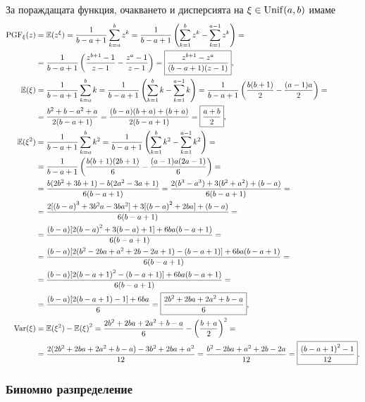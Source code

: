 \documentclass[numbers=endperiod, DIV=15, bibliography=totocnumbered]{scrartcl}
\begin{document}
За пораждащата функция, очакването и дисперсията на $\xi \in \operatorname{Unif}(a, b)$ имаме
\begingroup
\allowdisplaybreaks
\begin{align*}
  \operatorname{PGF}_\xi(z)
  &=
  \mathbb{E}(z^\xi)
  =
  \frac 1 {b-a+1} \sum_{k=a}^b z^k
  =
  \frac 1 {b-a+1} \left( \sum_{k=1}^b z^k - \sum_{k=1}^{a-1} z^k \right)
  = \\ &=
  \frac 1 {b-a+1} \left(\frac {z^{b+1} - 1} {z - 1} - \frac {z^a - 1} {z - 1} \right)
  =
  \boxed{\frac {z^{b+1} - z^a} {(b-a+1)(z-1)}},
  \\
  \mathbb{E}(\xi)
  &=
  \frac 1 {b-a+1} \sum_{k=a}^b k
  =
  \frac 1 {b-a+1} \left( \sum_{k=1}^b k - \sum_{k=1}^{a-1} k \right)
  =
  \frac 1 {b-a+1} \left( \frac {b(b+1)} 2 - \frac {(a-1)a} 2 \right)
  = \\ &=
  \frac {b^2 + b - a^2 + a} {2(b-a+1)}
  =
  \frac {(b-a)(b+a) + (b+a)} {2(b-a+1)}
  =
  \boxed{\frac {a+b} 2},
  \\
  \mathbb{E}(\xi^2)
  &=
  \frac 1 {b-a+1} \sum_{k=a}^b k^2
  =
  \frac 1 {b-a+1} \left( \sum_{k=1}^b k^2 - \sum_{k=1}^{a-1} k^2 \right)
  = \\ &=
  \frac 1 {b-a+1} \left( \frac {b(b+1)(2b+1)} 6 - \frac {(a-1)a(2a-1)} 6 \right)
  = \\ &=
  \frac {b(2b^2 + 3b + 1) - b(2a^2 - 3a + 1)} {6(b-a+1)}
  =
  \frac {2(b^3 - a^3) + 3(b^2 + a^2) + (b-a)} {6(b-a+1)}
  = \\ &=
  \frac {2[{(b-a)}^3 + 3b^2a - 3ba^2] + 3[{(b-a)}^2 + 2ba] + (b-a)} {6(b-a+1)}
  = \\ &=
  \frac {(b-a) [2{(b-a)}^2 + 3(b-a) + 1] + 6ba(b-a+1)} {6(b-a+1)}
  = \\ &=
  \frac {(b-a) [2(b^2 - 2ba + a^2 + 2b - 2a + 1) - (b-a+1)] + 6ba(b-a+1)} {6(b-a+1)}
  = \\ &=
  \frac {(b-a) [2{(b-a+1)}^2 - (b-a+1)] + 6ba(b-a+1)} {6(b-a+1)}
  = \\ &=
  \frac {(b-a) [2(b-a+1)-1] + 6ba} 6
  =
  \boxed{\frac {2b^2+2ba+2a^2+b-a} 6},
  \\
  \operatorname{Var}(\xi)
  &=
  \mathbb{E}(\xi^2) - {\mathbb{E}(\xi)}^2
  =
  \frac {2b^2+2ba+2a^2+b-a} 6 - {\left( \frac {b+a} 2 \right)}^2
  = \\ &=
  \frac {2(2b^2+2ba+2a^2+b-a) - 3{b^2+2ba+a^2}} {12}
  =
  \frac {b^2-2ba+a^2+2b-2a} {12}
  =
  \boxed{\frac {{(b-a+1)}^2-1} {12}}.
\end{align*}
\endgroup

\subsubsection{Биномно разпределение}\label{dist:geom}
\end{document}
